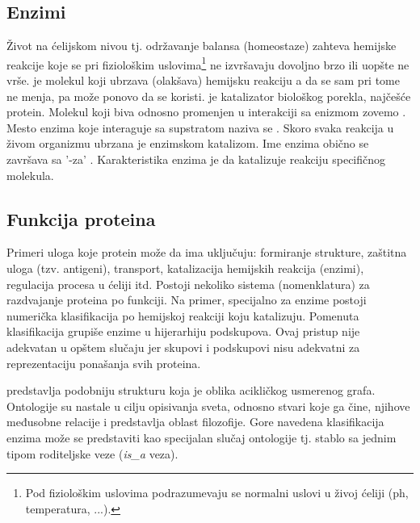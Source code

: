 
\subsection{Enzimi}

Život na ćelijskom nivou tj. održavanje balansa (homeostaze) zahteva hemijske
reakcije koje se pri fiziološkim uslovima\footnote{Pod fiziološkim uslovima
podrazumevaju se normalni uslovi u živoj ćeliji (ph, temperatura, ...).} ne
izvršavaju dovoljno brzo ili uopšte ne vrše.   je molekul
koji ubrzava (olakšava) hemijsku reakciju a da se sam pri tome ne menja, pa
može ponovo da se koristi.   je katalizator biološkog porekla,
najčešće protein.  Molekul koji biva  odnosno promenjen u
interakciji sa enizmom zovemo . Mesto enzima koje interaguje
sa supstratom naziva se .  Skoro svaka reakcija u živom
organizmu ubrzana je enzimskom katalizom. Ime enzima obično se završava sa
'-za' .  Karakteristika enzima je da katalizuje reakciju specifičnog
molekula.

\subsection{Funkcija proteina}

Primeri uloga koje protein može da ima uključuju: formiranje
strukture, zaštitna uloga (tzv. antigeni), transport, katalizacija hemijskih
reakcija (enzimi), regulacija procesa u ćeliji itd.  Postoji nekoliko sistema
(nomenklatura) za razdvajanje proteina po funkciji.  Na primer, specijalno za
enzime postoji numerička klasifikacija po hemijskoj reakciji koju katalizuju.
Pomenuta klasifikacija grupiše enzime u hijerarhiju podskupova. Ovaj pristup
nije adekvatan u opštem slučaju jer skupovi i podskupovi nisu adekvatni za
reprezentaciju ponašanja svih proteina.

 predstavlja podobniju strukturu koja je oblika acikličkog
usmerenog grafa.  Ontologije su nastale u cilju opisivanja sveta, odnosno
stvari koje ga čine, njihove međusobne relacije i predstavlja oblast
filozofije.  Gore navedena klasifikacija enzima može se predstaviti kao
specijalan slučaj ontologije tj. stablo sa jednim tipom roditeljske veze
(\textit{is\_a} veza).

